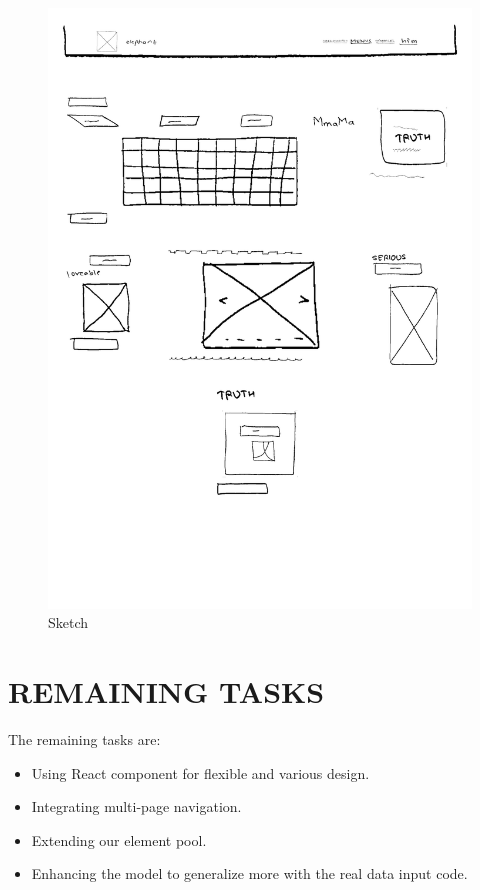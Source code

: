 \documentclass{ioereport}
\begin{document}
\begin{figure}[H]
\begin{minipage}{0.35\textwidth}
        \includegraphics[width=\linewidth]{images/sample2-sketch.png}
        \caption{Sketch}
        \label{fig:s22}
    \end{minipage}
\end{figure}
\vspace{1em} 
    \pagebreak




\section{\MakeUppercase{Remaining Tasks}}


The remaining tasks are:
\begin{itemize}
    \item Using React component for flexible and various design.
    \item Integrating multi-page navigation.
    \item Extending our element pool.
    \item Enhancing the model to generalize more with the real data input code.
\end{itemize}
\end{document}
